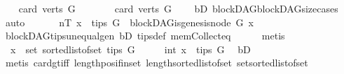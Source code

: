\begin{isabellebody}
\ \ \isamarkupfalse%
\ {\isachardoublequoteopen}card\ {\isacharparenleft}{\kern0pt}verts\ G{\isacharparenright}{\kern0pt}\ {\isasymnoteq}\ {}{\isachardoublequoteclose}\isanewline
\ \ \isamarkupfalse%
\ \isamarkupfalse%
\ {\isachardoublequoteopen}card\ {\isacharparenleft}{\kern0pt}verts\ G{\isacharparenright}{\kern0pt}\ {\isachargreater}{\kern0pt}\ {}{\isachardoublequoteclose}\ \isamarkupfalse%
\ bD\ blockDAG{\isachardot}{\kern0pt}blockDAG{\isacharunderscore}{\kern0pt}size{\isacharunderscore}{\kern0pt}cases\ \isamarkupfalse%
\ auto\ \isanewline
\ \ \isamarkupfalse%
\ \isamarkupfalse%
\ nT{\isacharcolon}{\kern0pt}\ {\isachardoublequoteopen}{\isasymforall}x\ {\isasymin}\ tips\ G{\isachardot}{\kern0pt}\ {\isasymnot}\ blockDAG{\isachardot}{\kern0pt}is{\isacharunderscore}{\kern0pt}genesis{\isacharunderscore}{\kern0pt}node\ G\ x{\isachardoublequoteclose}\isanewline
\ \ \ \ \isamarkupfalse%
\ blockDAG{\isachardot}{\kern0pt}tips{\isacharunderscore}{\kern0pt}unequal{\isacharunderscore}{\kern0pt}gen\ bD\ tips{\isacharunderscore}{\kern0pt}def\ mem{\isacharunderscore}{\kern0pt}Collect{\isacharunderscore}{\kern0pt}eq\isanewline
\ \ \ \ \isamarkupfalse%
\ metis\isanewline
\ \ \isamarkupfalse%
\ {\isachardoublequoteopen}\ x\ {\isasymin}\ set\ {\isacharparenleft}{\kern0pt}sorted{\isacharunderscore}{\kern0pt}list{\isacharunderscore}{\kern0pt}of{\isacharunderscore}{\kern0pt}set\ {\isacharparenleft}{\kern0pt}tips\ G{\isacharparenright}{\kern0pt}{\isacharparenright}{\kern0pt}{\isachardoublequoteclose}\isanewline
\ \ \isamarkupfalse%
\ \isamarkupfalse%
\ in{\isacharunderscore}{\kern0pt}t{\isacharcolon}{\kern0pt}\ {\isachardoublequoteopen}x\ {\isasymin}\ tips\ G{\isachardoublequoteclose}\ \isamarkupfalse%
\ bD\isanewline
\ \ \ \ \isamarkupfalse%
\ {\isacharparenleft}{\kern0pt}metis\ card{\isacharunderscore}{\kern0pt}gt{\isacharunderscore}{\kern0pt}{}{\isacharunderscore}{\kern0pt}iff\ length{\isacharunderscore}{\kern0pt}pos{\isacharunderscore}{\kern0pt}if{\isacharunderscore}{\kern0pt}in{\isacharunderscore}{\kern0pt}set\ length{\isacharunderscore}{\kern0pt}sorted{\isacharunderscore}{\kern0pt}list{\isacharunderscore}{\kern0pt}of{\isacharunderscore}{\kern0pt}set\ set{\isacharunderscore}{\kern0pt}sorted{\isacharunderscore}{\kern0pt}list{\isacharunderscore}{\kern0pt}of{\isacharunderscore}{\kern0pt}set{\isacharparenright}{\kern0pt}\ \isanewline

\end{isabellebody}
